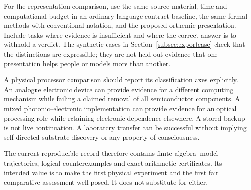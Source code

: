 For the representation comparison, use the same source material, time and computational budget in an ordinary-language contract baseline, the same formal methods with conventional notation, and the proposed orthemic presentation. Include tasks where evidence is insufficient and where the correct answer is to withhold a verdict. The synthetic cases in Section~\ref{subsec:exportcase} check that the distinctions are expressible; they are not held-out evidence that one presentation helps people or models more than another.

A physical processor comparison should report its classification axes explicitly. An analogue electronic device can provide evidence for a different computing mechanism while failing a claimed removal of all semiconductor components. A mixed photonic--electronic implementation can provide evidence for an optical processing role while retaining electronic dependence elsewhere. A stored backup is not live continuation. A laboratory transfer can be successful without implying self-directed substrate discovery or any property of consciousness.

The current reproducible record therefore contains finite algebra, model trajectories, logical counterexamples and exact arithmetic certificates. Its intended value is to make the first physical experiment and the first fair comparative assessment well-posed. It does not substitute for either.
